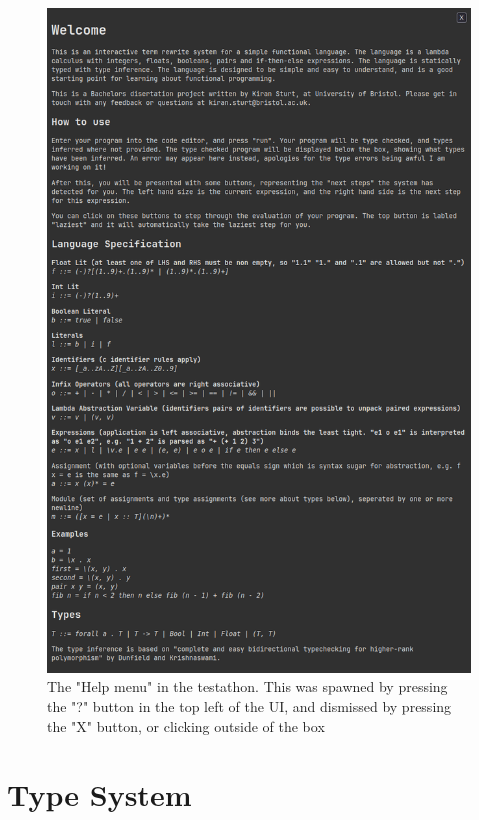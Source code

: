 \begin{figure}
    \centering
    \includegraphics[width=0.9\linewidth]{images/testathon_help_menu_cropped.png}
    \caption{The "Help menu" in the testathon. This was spawned by pressing the "?" button in the top left of the UI, and dismissed by pressing the "X" button, or clicking outside of the box}
    \label{fig:screenshot_testathon_2}
\end{figure}

\chapter{Type System}
